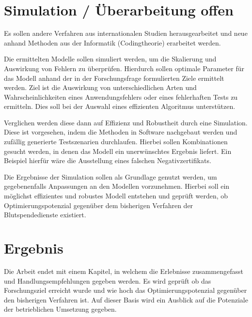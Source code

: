 \section{Simulation / Überarbeitung offen}
Es sollen andere Verfahren aus internationalen Studien herausgearbeitet und neue anhand Methoden aus der Informatik (Codingtheorie) erarbeitet werden. 

Die ermittelten Modelle sollen simuliert werden, um die Skalierung und Auswirkung von Fehlern zu überprüfen.
Hierdurch sollen optimale Parameter für das Modell anhand der in der Forschungsfrage formulierten Ziele ermittelt werden.
Ziel ist die Auswirkung von unterschiedlichen Arten und Wahrscheinlichkeiten eines Anwendungsfehlers oder eines fehlerhaften Tests zu ermitteln.
Dies soll bei der Auswahl eines effizienten Algoritmus unterstützen.

Verglichen werden diese dann auf Effizienz und Robustheit durch eine Simulation.
Diese ist vorgesehen, indem die Methoden in Software nachgebaut werden und zufällig generierte Testszenarien durchlaufen.
Hierbei sollen Kombinationen gesucht werden, in denen das Modell ein unerwünschtes Ergebnis liefert.
Ein Beispiel hierfür wäre die Ausstellung eines falschen Negativzertifikats.

Die Ergebnisse der Simulation sollen als Grundlage genutzt werden, um gegebenenfalls Anpassungen an den Modellen vorzunehmen.
Hierbei soll ein möglichst effizientes und robustes Modell entstehen und geprüft werden, ob Optimierungspotenzial gegenüber dem bisherigen Verfahren der Blutspendedienste existiert.

\section{Ergebnis}
Die Arbeit endet mit einem Kapitel, in welchem die Erlebnisse zusammengefasst und Handlungsempfehlungen gegeben werden.
Es wird geprüft ob das Forschungsziel erreicht wurde und wie hoch das Optimierungspotenzial gegenüber den bisherigen Verfahren ist.
Auf dieser Basis wird ein Ausblick auf die Potenziale der betrieblichen Umsetzung gegeben.

